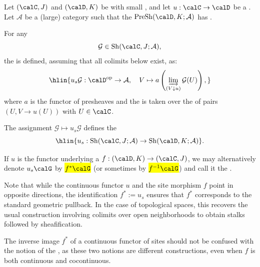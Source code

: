 \begin{definition} \label{definition:inverse_image_of_a_sheaf_under_a_continuous_functor_of_sites_or_a_site_morphism}
Let $(\calC,J)$ and $(\calD,K)$ be  with small , and let $u : \calC \to \calD$ be a . Let $\mathcal{A}$ be a (large) category such that the  $\operatorname{PreSh}(\calD,K;\mathcal{A})$ has .

For any  
\[
\mathcal{G} \in \operatorname{Sh}(\calC,J;\mathcal{A}),
\]
the  is defined, assuming that all colimits below exist, as:
$$\hlin{u_s \mathcal{G} : \calD^{\mathrm{op}} \to \mathcal{A}, \quad V \mapsto a \left( \varinjlim_{(V \downarrow u)} \mathcal{G}(U) \right),}$$
where $a$ is the  functor of presheaves and the  is taken over the  of pairs $(U, V \to u(U))$ with $U \in \calC$.

The assignment $\mathcal{G} \mapsto u_s\mathcal{G}$ defines the 
$$\hlin{u_s : \operatorname{Sh}(\calC,J;\mathcal{A}) \to \operatorname{Sh}(\calD,K;\mathcal{A})}.$$

If $u$ is the functor underlying a  $f: (\calD, K) \to (\calC, J)$, we may alternatively denote $u_s \calG$ by \hl{$f^{*} \calG$} (or sometimes by \hl{$f^{-1} \calG$}) and call it the .


Note that while the continuous functor $u$ and the site morphism $f$ point in opposite directions, the identification $f^* := u_s$ ensures that $f^*$ corresponds to the standard geometric pullback. In the case of topological spaces, this recovers the usual construction involving colimits over open neighborhoods to obtain stalks followed by sheafification.

The inverse image $f^*$ of a continuous functor of sites should not be confused with the notion of the , as these two notions are different constructions, even when $f$ is both continuous and cocontinuous.

\end{definition}
